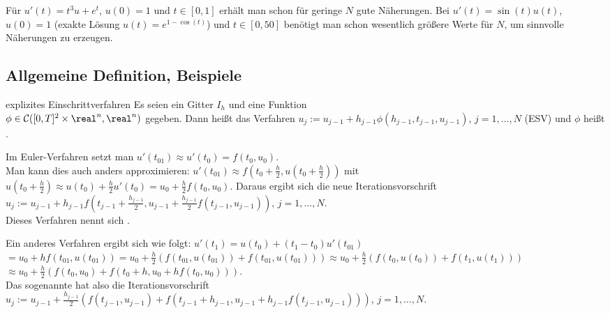\begin{Bsp}
    Für $u'(t) = t^3 u + e^t$, $u(0) = 1$ und $t \in [0, 1]$ erhält man schon
    für geringe $N$ gute Näherungen.
    Bei $u'(t) = \sin(t) u(t)$, $u(0) = 1$
    (exakte Lösung $u(t) = e^{1 - \cos(t)}$) und $t \in [0, 50]$
    benötigt man schon wesentlich größere Werte für $N$, um sinnvolle
    Näherungen zu erzeugen.
\end{Bsp}

\subsection{%
    Allgemeine Definition, Beispiele%
}

\begin{Def}{explizites Einschrittverfahren}
    Es seien ein Gitter $I_h$ und eine Funktion\\
    $\phi \in \C([0, T]^2 \times \real^n, \real^n)$ gegeben.
    Dann heißt das Verfahren
    $u_j := u_{j-1} + h_{j-1} \phi(h_{j-1}, t_{j-1}, u_{j-1})$,
    $j = 1, \dotsc, N$  (ESV)
    und $\phi$ heißt .
\end{Def}

\begin{Bsp}
    Im Euler-Verfahren setzt man
    $u'(t_{01}) \approx u'(t_0) = f(t_0, u_0)$.\\
    Man kann dies auch anders approximieren:
    $u'(t_{01}) \approx f(t_0 + \frac{h}{2}, u(t_0 + \frac{h}{2}))$ mit\\
    $u(t_0 + \frac{h}{2}) \approx u(t_0) + \frac{h}{2} u'(t_0) =
    u_0 + \frac{h}{2} f(t_0, u_0)$.
    Daraus ergibt sich die neue Iterationsvorschrift
    $u_j := u_{j-1} + h_{j-1} f(t_{j-1} + \frac{h_{j-1}}{2}, u_{j-1} +
    \frac{h_{j-1}}{2} f(t_{j-1}, u_{j-1}))$, $j = 1, \dotsc, N$.\\
    Dieses Verfahren nennt sich
    .
\end{Bsp}

\begin{Bsp}
    Ein anderes Verfahren ergibt sich wie folgt:
    $u'(t_1) = u(t_0) + (t_1 - t_0) u'(t_{01})$\\
    $= u_0 + h f(t_{01}, u(t_{01})) =
    u_0 + \frac{h}{2} (f(t_{01}, u(t_{01})) + f(t_{01}, u(t_{01}))) \approx
    u_0 + \frac{h}{2} (f(t_0, u(t_0)) + f(t_1, u(t_1)))$\\
    $\approx
    u_0 + \frac{h}{2} (f(t_0, u_0) + f(t_0 + h, u_0 + h f(t_0, u_0)))$.\\
    Das sogenannte  hat also die
    Iterationsvorschrift\\
    $u_j := u_{j-1} + \frac{h_{j-1}}{2} (f(t_{j-1}, u_{j-1}) +
    f(t_{j-1} + h_{j-1}, u_{j-1} + h_{j-1} f(t_{j-1}, u_{j-1})))$,
    $j = 1, \dotsc, N$.
\end{Bsp}


